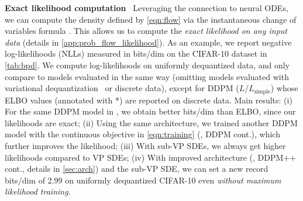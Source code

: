 \textbf{Exact likelihood computation}~ Leveraging the connection to neural ODEs, we can compute the density defined by \cref{eqn:flow}  via the instantaneous change of variables formula \citep{chen2018neural}. This allows us to compute the \emph{exact likelihood on any input data} (details in \cref{app:prob_flow_likelihood}). %
As an example, we report negative log-likelihoods (NLLs) measured in bits/dim on the CIFAR-10 dataset in \cref{tab:bpd}. We compute log-likelihoods on uniformly dequantized data, and only compare to models evaluated in the same way (omitting models evaluated with variational dequantization~\citep{ho2019flow++} or discrete data), except for DDPM ($L$/$L_\text{simple}$) whose ELBO values (annotated with *) are reported on discrete data. Main results: (i) For the same DDPM model in \citet{ho2020denoising}, we obtain better bits/dim than ELBO, since our likelihoods are exact; (ii) Using the same architecture, we trained another DDPM model with the continuous objective in \cref{eqn:training} (\ie, DDPM cont.), which further improves the likelihood; (iii) With sub-VP SDEs, we always get higher likelihoods compared to VP SDEs; (iv) With improved architecture (\ie, DDPM++ cont., details in \cref{sec:arch}) and the sub-VP SDE, we can set a new record bits/dim of 2.99 on uniformly dequantized CIFAR-10 even \emph{without maximum likelihood training}.

